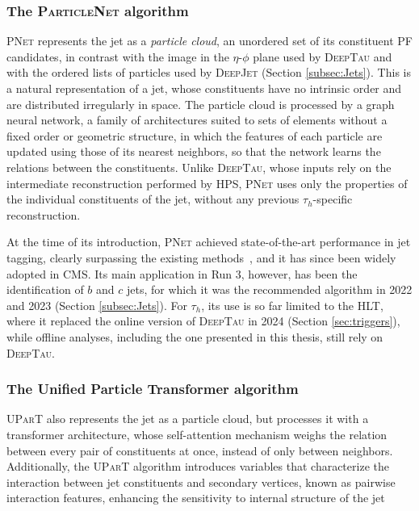 \subsubsection{The \textsc{ParticleNet} algorithm}
%
\textsc{PNet} represents the jet as a \textit{particle cloud}, an unordered set of its constituent PF candidates, in contrast with the image in the $\eta$-$\phi$ plane used by \textsc{DeepTau} and with the ordered lists of particles used by \textsc{DeepJet} (Section \ref{subsec:Jets}). This is a natural representation of a jet, whose constituents have no intrinsic order and are distributed irregularly in space. The particle cloud is processed by a graph neural network, a family of architectures suited to sets of elements without a fixed order or geometric structure, in which the features of each particle are updated using those of its nearest neighbors, so that the network learns the relations between the constituents. Unlike \textsc{DeepTau}, whose inputs rely on the intermediate reconstruction performed by HPS, \textsc{PNet} uses only the properties of the individual constituents of the jet, without any previous $\tau_h$-specific reconstruction.

At the time of its introduction, \textsc{PNet} achieved state-of-the-art performance in jet tagging, clearly surpassing the existing methods~\cite{PNet}, and it has since been widely adopted in CMS. Its main application in Run 3, however, has been the identification of $b$ and $c$ jets, for which it was the recommended algorithm in 2022 and 2023 (Section \ref{subsec:Jets}). For $\tau_h$, its use is so far limited to the HLT, where it replaced the online version of \textsc{DeepTau} in 2024 (Section \ref{sec:triggers}), while offline analyses, including the one presented in this thesis, still rely on \textsc{DeepTau}.




\subsubsection{The Unified Particle Transformer algorithm}
%
\textsc{UParT} also represents the jet as a particle cloud, but processes it with a transformer architecture, whose self-attention mechanism weighs the relation between every pair of constituents at once, instead of only between neighbors. Additionally, the \textsc{UParT} algorithm introduces variables that characterize the interaction between jet constituents and secondary vertices, known as pairwise interaction features, enhancing the sensitivity to internal structure of the jet

